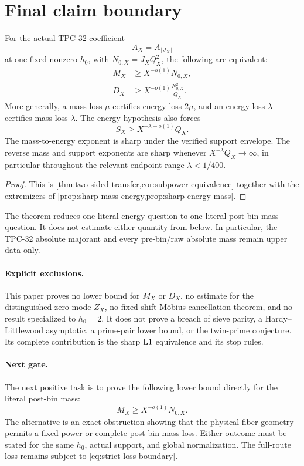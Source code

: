\section{Final claim boundary}
\label{sec:claim-boundary}

\begin{theorem}
\label{thm:final-equivalence}
For the actual TPC-32 coefficient
\[
 A_X=A_{\lfloor J_X\rfloor}
\]
at one fixed nonzero \(h_0\), with
\(N_{0,X}=J_XQ_X^2\), the following are equivalent:
\begin{align}
 M_X&\ge X^{-o(1)}N_{0,X},
\label{eq:final-mass}\\
 D_X&\ge
 X^{-o(1)}\frac{N_{0,X}^2}{Q_X}.
\label{eq:final-energy}
\end{align}
More generally, a mass loss \(\mu\) certifies energy loss
\(2\mu\), and an energy loss \(\lambda\) certifies mass loss
\(\lambda\).  The energy hypothesis also forces
\[
 S_X\ge X^{-\lambda-o(1)}Q_X.
\]
The mass-to-energy exponent is sharp under the verified support
envelope.  The reverse mass and support exponents are sharp whenever
\(X^{-\lambda}Q_X\to\infty\), in particular throughout the relevant
endpoint range \(\lambda<1/400\).
\end{theorem}

\begin{proof}
This is
\cref{thm:two-sided-transfer,cor:subpower-equivalence} together with
the extremizers of
\cref{prop:sharp-mass-energy,prop:sharp-energy-mass}.
\end{proof}

The theorem reduces one literal energy question to one literal
post-bin mass question.  It does not estimate either quantity from
below.  In particular, the TPC-32 absolute majorant and every
pre-bin/raw absolute mass remain upper data only.

\paragraph{Explicit exclusions.}
This paper proves no lower bound for \(M_X\) or \(D_X\), no estimate
for the distinguished zero mode \(Z_X\), no fixed-shift M\"obius
cancellation theorem, and no result specialized to \(h_0=2\).  It
does not prove a breach of sieve parity, a Hardy--Littlewood
asymptotic, a prime-pair lower bound, or the twin-prime conjecture.
Its complete contribution is the sharp \(\mathrm{L1}\) equivalence and its
stop rules.

\paragraph{Next gate.}
The next positive task is to prove the following lower bound directly
for the literal post-bin mass:
\[
 M_X\ge X^{-o(1)}N_{0,X}.
\]
The alternative is an exact obstruction showing that the physical
fiber geometry permits a fixed-power or complete post-bin mass loss.
Either outcome must be stated for the same \(h_0\), actual support,
and global normalization.  The full-route loss remains subject to
\eqref{eq:strict-loss-boundary}.
